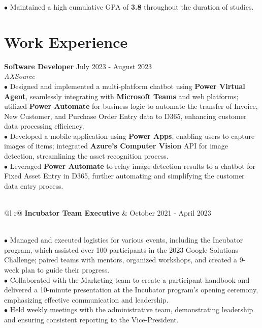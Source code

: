 \documentclass[letterpaper,12pt]{article}
\begin{document}
\hspace{0.3cm} $\bullet$ {\fontsize{10pt}{9pt}\selectfont Maintained a high cumulative GPA of \textbf{3.8} throughout the duration of studies.}

\section{Work Experience}

\textbf{Software Developer}  \hfill   July 2023 - August 2023 \\
\textit{AXSource} 
\vspace{0.3cm}  
\\\hspace{0.1cm} $\bullet$ Designed and implemented a multi-platform chatbot using \textbf{Power Virtual Agent}, seamlessly integrating with \textbf{Microsoft Teams} and web platforms; utilized \textbf{Power Automate} for business logic to automate the transfer of Invoice, New Customer, and Purchase Order Entry data to D365, enhancing customer data processing efficiency.\\
\hspace{0.1cm} $\bullet$ \hspace{0.05cm}Developed a mobile application using \textbf{Power Apps}, enabling users to capture images of items; integrated \textbf{Azure's Computer Vision} API for image detection, streamlining the asset recognition process. \\
\hspace{0.1cm} $\bullet$ \hspace{0.05cm} Leveraged \textbf{Power Automate} to relay image detection results to a chatbot for Fixed Asset Entry in D365, further automating and simplifying the customer data entry process. \\\\
\begin{tabularx}{\linewidth}{ @{}l r@{} }
    \textbf{Incubator Team Executive} &  \hfill \normalsize{October 2021 - April 2023} \\
\end{tabularx} 
\vspace{0.25cm} \\
\hspace{0.1cm} $\bullet$ Managed and executed logistics for various events, including the Incubator program, which assisted over 100 participants in the 2023 Google Solutions Challenge; paired teams with mentors, organized workshops, and created a 9-week plan to guide their progress. \\ 
\hspace{0.1cm} $\bullet$ \hspace{0.05cm}Collaborated with the Marketing team to create a participant handbook and delivered a 10-minute presentation at the Incubator program's opening ceremony, emphasizing effective communication and leadership.\\
\hspace{0.1cm} $\bullet$ \hspace{0.03cm}Held weekly meetings with the administrative team, demonstrating leadership and ensuring consistent reporting to the Vice-President.
\end{document}
